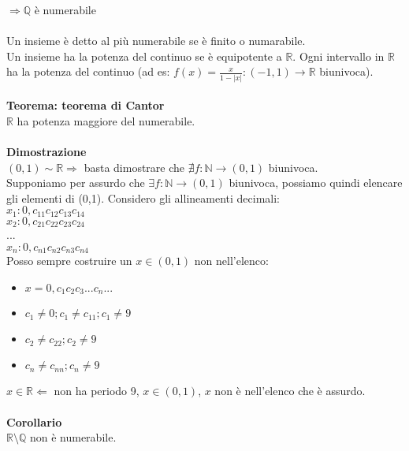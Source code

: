 \documentclass{article}
\begin{document}
$\Rightarrow \mathds{Q}$ è numerabile\\
\\
Un insieme è detto al più numerabile se è finito o numarabile.\\
Un insieme ha la potenza del continuo se è equipotente a $\mathds{R}$. Ogni intervallo in $\mathds{R}$ ha la potenza del continuo (ad es: $f(x)= \frac{x}{1-|x|}: (-1, 1) \rightarrow \mathds{R}$ biunivoca).\\\\
\textbf{Teorema: teorema di Cantor}\\
$\mathds{R}$ ha potenza maggiore del numerabile.\\\\
\textbf{Dimostrazione}\\
$(0, 1) \sim \mathds{R} \Rightarrow$ basta dimostrare che $\nexists f: \mathds{N} \rightarrow (0,1)$ biunivoca.\\
Supponiamo per assurdo che $\exists f: \mathds{N} \rightarrow (0,1)$ biunivoca, possiamo quindi elencare gli elementi di (0,1). Considero gli allineamenti decimali:\\
$x_1: 0,c_{11}c_{12}c_{13}c_{14}$\\
$x_2: 0,c_{21}c_{22}c_{23}c_{24}$\\
...\\
$x_n: 0,c_{n1}c_{n2}c_{n3}c_{n4}$\\
Posso sempre costruire un $x \in (0,1)$ non nell'elenco: \begin{itemize}
    \item $x = 0,c_1c_2c_3...c_n...$
    \item $c_1 \neq 0; c_1 \neq c_{11}; c_1 \neq 9$
    \item $c_2 \neq c_{22}; c_2 \neq 9$
    \item $c_n \neq c_{nn}; c_n \neq 9$
\end{itemize}
$x \in \mathds{R} \Leftarrow$ non ha periodo 9, $x \in (0,1)$, $x$ non è nell'elenco che è assurdo.\\
\\
\textbf{Corollario}\\
$\mathds{R} \setminus \mathds{Q}$ non è numerabile.
\end{document}
